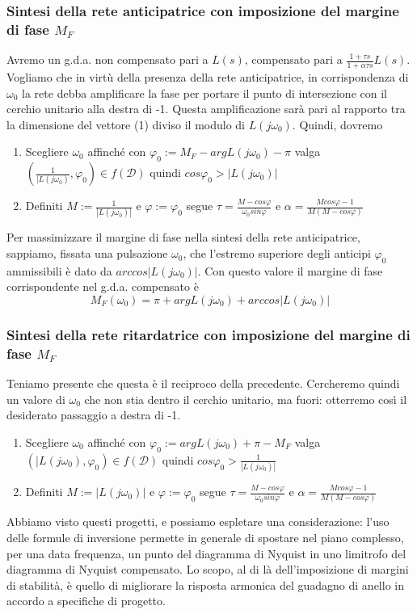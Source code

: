 \documentclass[11pt]{article}
\begin{document}
\subsubsection{Sintesi della rete anticipatrice con imposizione del margine di fase $M_F$}
Avremo un g.d.a. non compensato pari a $L(s)$, compensato pari a $\frac{1+\tau s}{1+\alpha\tau s} L(s)$.
Vogliamo che in virtù della presenza della rete anticipatrice, in corrispondenza di $\omega_0$ la rete debba amplificare la fase per portare il punto di intersezione con il cerchio unitario alla destra di -1. Questa amplificazione sarà pari al rapporto tra la dimensione del vettore (1) diviso il modulo di $L(j\omega_0)$. Quindi, dovremo
\begin{enumerate}
    \item Scegliere $\omega_0$ affinché con $\varphi_0 := M_F - argL(j\omega_0)-\pi$ valga $\left(\frac{1}{|L(j\omega_0)}, \varphi_0\right) \in f(\mathcal{D})$ quindi $cos\varphi_0 > |L(j\omega_0)|$
    \item Definiti $M:=\frac{1}{|L(j\omega_0)|}$ e $\varphi := \varphi_0$ segue $\tau = \frac{M-cos\varphi}{\omega_0 sin\varphi} $ e $\alpha=\frac{Mcos\varphi-1}{M(M-cos\varphi)}$
\end{enumerate}
Per massimizzare il margine di fase nella sintesi della rete anticipatrice, sappiamo, fissata una pulsazione $\omega_0$, che l'estremo superiore degli anticipi $\varphi_0$ ammissibili è dato da $arccos|L(j\omega_0)|$. Con questo valore il margine di fase corrispondente nel g.d.a. compensato è
\begin{displaymath}
    M_F(\omega_0) = \pi + argL(j\omega_0)+arccos|L(j\omega_0)|
\end{displaymath}
\subsubsection{Sintesi della rete ritardatrice con imposizione del margine di fase $M_F$}
Teniamo presente che questa è il reciproco della precedente. Cercheremo quindi un valore di $\omega_0$ che non stia dentro il cerchio unitario, ma fuori: otterremo così il desiderato passaggio a destra di -1.
\begin{enumerate}
    \item Scegliere $\omega_0$ affinché con $\varphi_0 := argL(j\omega_0)+\pi - M_F$ valga $\left(|L(j\omega_0), \varphi_0\right) \in f(\mathcal{D})$ quindi $cos\varphi_0 > \frac{1}{|L(j\omega_0)|}$
    \item Definiti $M:=|L(j\omega_0)|$ e $\varphi := \varphi_0$ segue $\tau = \frac{M-cos\varphi}{\omega_0 sin\varphi} $ e $\alpha=\frac{Mcos\varphi-1}{M(M-cos\varphi)}$
\end{enumerate}
Abbiamo visto questi progetti, e possiamo espletare una considerazione: l'uso delle formule di inversione permette in generale di spostare nel piano complesso, per una data frequenza, un punto del diagramma di Nyquist in uno limitrofo del diagramma di Nyquist compensato. Lo scopo, al di là dell'imposizione di margini di stabilità, è quello di migliorare la risposta armonica del guadagno di anello in accordo a specifiche di progetto.
\end{document}
